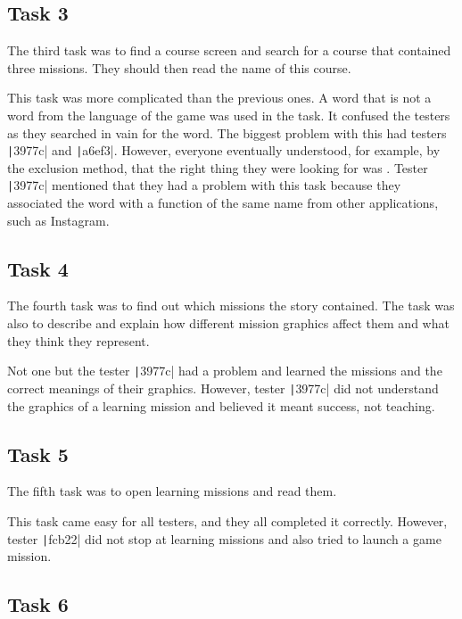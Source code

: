 \subsection*{Task 3}

The third task was to find a course screen and search for a course that contained three missions.
They should then read the name of this course.

This task was more complicated than the previous ones.
A word that is not a word from the language of the game was used in the task.
It confused the testers as they searched in vain for the word.
The biggest problem with this had testers \texttt|3977c| and \texttt|a6ef3|.
However, everyone eventually understood, for example, by the exclusion method, that the right thing they were looking for was .
Tester \texttt|3977c| mentioned that they had a problem with this task because they associated the word  with a function of the same name from other applications, such as Instagram.

\subsection*{Task 4}

The fourth task was to find out which missions the story contained.
The task was also to describe and explain how different mission graphics affect them and what they think they represent.

Not one but the tester \texttt|3977c| had a problem and learned the missions and the correct meanings of their graphics.
However, tester \texttt|3977c| did not understand the graphics of a learning mission and believed it meant success, not teaching.

\subsection*{Task 5}

The fifth task was to open learning missions and read them.

This task came easy for all testers, and they all completed it correctly.
However, tester \texttt|fcb22| did not stop at learning missions and also tried to launch a game mission.

\subsection*{Task 6}

